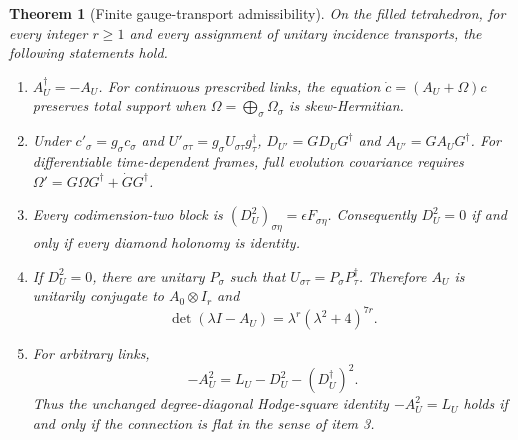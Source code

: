 \documentclass[11pt,a4paper]{article}
\newtheorem{theorem}{Theorem}
\newcommand{\ad}{\dagger}
\begin{document}
\begin{theorem}[Finite gauge-transport admissibility]\label{th:main}
On the filled tetrahedron, for every integer $r\geq1$ and every assignment
of unitary incidence transports, the following statements hold.
\begin{enumerate}
\item $A_U^\ad=-A_U$. For continuous prescribed links, the equation
$\dot c=(A_U+\Omega)c$ preserves total support when
$\Omega=\bigoplus_\sigma\Omega_\sigma$ is skew-Hermitian.
\item Under $c'_\sigma=g_\sigma c_\sigma$ and
$U'_{\sigma\tau}=g_\sigma U_{\sigma\tau}g_\tau^\ad$,
$D_{U'}=GD_UG^\ad$ and $A_{U'}=GA_UG^\ad$.
For differentiable time-dependent frames, full evolution covariance
requires $\Omega'=G\Omega G^\ad+\dot G G^\ad$.
\item Every codimension-two block is
$(D_U^2)_{\sigma\eta}=\epsilon F_{\sigma\eta}$.
Consequently $D_U^2=0$ if and only if every diamond holonomy is identity.
\item If $D_U^2=0$, there are unitary $P_\sigma$ such that
$U_{\sigma\tau}=P_\sigma P_\tau^\ad$. Therefore $A_U$ is unitarily
conjugate to $A_0\otimes I_r$ and
\[
 \det(\lambda I-A_U)=\lambda^r(\lambda^2+4)^{7r}.     \tag{3}
\]
\item For arbitrary links,
\[
 -A_U^2=L_U-D_U^2-(D_U^\ad)^2.                     \tag{4}
\]
Thus the unchanged degree-diagonal Hodge-square identity $-A_U^2=L_U$
holds if and only if the connection is flat in the sense of item 3.
\end{enumerate}
\end{theorem}
\end{document}
